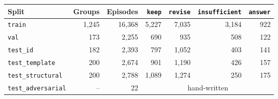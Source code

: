 \begin{tabular}{lrrrrrr}
\toprule
Split & Groups & Episodes & \texttt{keep} & \texttt{revise} & \texttt{insufficient} & \texttt{answer} \\
\midrule
\texttt{train} & 1,245 & 16,368 & 5,227 & 7,035 & 3,184 & 922 \\
\texttt{val} & 173 & 2,255 & 690 & 935 & 508 & 122 \\
\texttt{test\_id} & 182 & 2,393 & 797 & 1,052 & 403 & 141 \\
\texttt{test\_template} & 200 & 2,674 & 901 & 1,190 & 426 & 157 \\
\texttt{test\_structural} & 200 & 2,788 & 1,089 & 1,274 & 250 & 175 \\
\texttt{test\_adversarial} & -- & 22 & \multicolumn{4}{c}{hand-written} \\
\bottomrule
\end{tabular}
